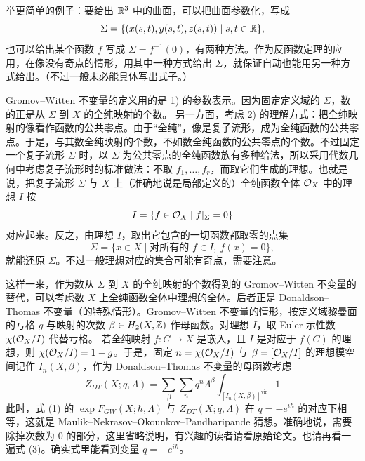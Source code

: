 举更简单的例子：要给出 $\mathbb{R}^3$ 中的曲面，可以把曲面参数化，写成
\[
  \Sigma=\{(x(s,t),y(s,t),z(s,t))\mid s,t\in\mathbb{R}\},
\]
也可以给出某个函数 $f$ 写成 $\Sigma=f^{-1}(0)$，有两种方法。作为反函数定理的应用，在像没有奇点的情形，用其中一种方式给出 $\Sigma$，就保证自动也能用另一种方式给出。（不过一般未必能具体写出式子。）

Gromov--Witten 不变量的定义用的是 1) 的参数表示。因为固定定义域的 $\Sigma$，数的正是从 $\Sigma$ 到 $X$ 的全纯映射的个数。
另一方面，考虑 2) 的理解方式：把全纯映射的像看作函数的公共零点。由于“全纯”，像是复子流形，成为全纯函数的公共零点。于是，与其数全纯映射的个数，不如数全纯函数的公共零点的个数。不过固定一个复子流形 $\Sigma$ 时，以 $\Sigma$ 为公共零点的全纯函数族有多种给法，所以采用代数几何中考虑复子流形时的标准做法：不取 $f_1,\dots,f_r$，而取它们生成的理想。也就是说，把复子流形 $\Sigma$ 与 $X$ 上（准确地说是局部定义的）全纯函数全体 $\mathcal{O}_X$ 中的理想 $I$ 按
\[
  I=\{f\in\mathcal{O}_X\mid f|_\Sigma=0\}
\]
对应起来。反之，由理想 $I$，取出它包含的一切函数都取零的点集
\[
  \Sigma=\{x\in X\mid \text{对所有的 } f\in I,\ f(x)=0\},
\]
就能还原 $\Sigma$。不过一般理想对应的集合可能有奇点，需要注意。

这样一来，作为数从 $\Sigma$ 到 $X$ 的全纯映射的个数得到的 Gromov--Witten 不变量的替代，可以考虑数 $X$ 上全纯函数全体中理想的全体。后者正是 Donaldson--Thomas 不变量（的特殊情形）。Gromov--Witten 不变量的情形，按定义域黎曼面的亏格 $g$ 与映射的次数 $\beta\in H_2(X,\mathbb{Z})$ 作母函数。对理想 $I$，取 Euler 示性数 $\chi(\mathcal{O}_X/I)$ 代替亏格。
若全纯映射 $f:C\to X$ 是嵌入，且 $I$ 是对应于 $f(C)$ 的理想，则 $\chi(\mathcal{O}_X/I)=1-g$。于是，固定 $n=\chi(\mathcal{O}_X/I)$ 与 $\beta=[\mathcal{O}_X/I]$ 的理想模空间记作 $I_n(X,\beta)$，作为 Donaldson--Thomas 不变量的母函数考虑
\begin{equation}
  Z_{DT}(X;q,\Lambda)=\sum_{\beta}\sum_{n}q^n\Lambda^{\beta}\int_{[I_n(X,\beta)]^{\mathrm{vir}}}1
  \tag{4}
\end{equation}
此时，式 (1) 的 $\exp F_{GW}(X;\hbar,\Lambda)$ 与 $Z_{DT}(X;q,\Lambda)$ 在 $q=-e^{i\hbar}$ 的对应下相等，这就是 Maulik--Nekrasov--Okounkov--Pandharipande 猜想。准确地说，需要除掉次数为 0 的部分，这里省略说明，有兴趣的读者请看原始论文。也请再看一遍式 (3)。确实式里能看到变量 $q=-e^{i\hbar}$。

